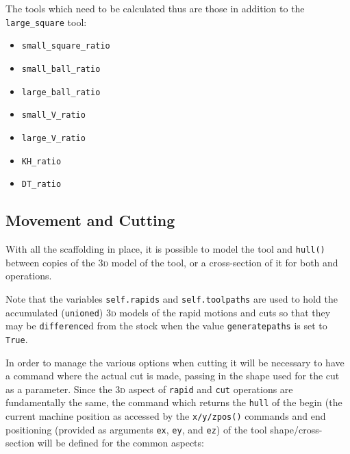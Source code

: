 \documentclass{ltxdoc}
\begin{document}
The tools which need to be calculated thus are those in addition to the \verb|large_square| tool:

\begin{itemize}
\item \verb|small_square_ratio|
\item \verb|small_ball_ratio|
\item \verb|large_ball_ratio|
\item \verb|small_V_ratio|
\item \verb|large_V_ratio|
\item \verb|KH_ratio|
\item \verb|DT_ratio|
\end{itemize}

\subsection{Movement and Cutting}

With all the scaffolding in place, it is possible to model the tool and \verb|hull()| between copies of the \textsc{3d} model of the tool, or a cross-section of it for both  and  operations.


Note that the variables \verb|self.rapids| and \verb|self.toolpaths| are used to hold the accumulated (\verb|unioned|) \textsc{3d} models of the rapid motions and cuts so that they may be \verb|difference|d from the stock when the value \verb|generatepaths| is set to \verb|True|.

In order to manage the various options when cutting it will be necessary to have a command where the actual cut is made, passing in the shape used for the cut as a parameter. Since the \textsc{3d} aspect of \verb|rapid| and \verb|cut| operations are fundamentally the same, the command  which returns the \verb|hull| of the begin (the current machine position as accessed by the \verb|x/y/zpos()| commands and end positioning (provided as arguments \verb|ex|, \verb|ey|, and \verb|ez|) of the tool shape/cross-section will be defined for the common aspects:
\end{document}
